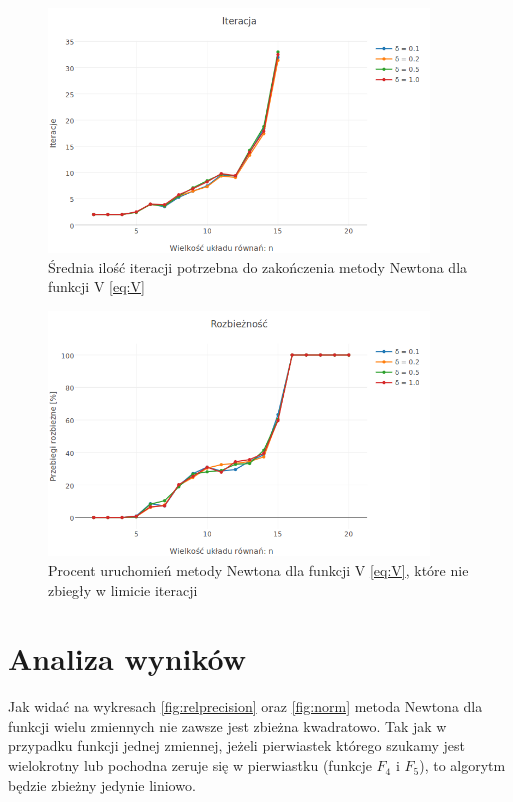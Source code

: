 \documentclass[11pt,wide]{mwart}
\begin{document}
\begin{figure}[h]
    \centering
    \includegraphics[width=0.9\textwidth]{avg_iterations_V}
    \caption{Średnia ilość iteracji potrzebna do zakończenia metody Newtona dla funkcji V \eqref{eq:V}}
    \label{fig:avgiterationsV}
\end{figure}

\begin{figure}[h]
    \centering
    \includegraphics[width=0.9\textwidth]{avg_diversions_V}
    \caption{Procent uruchomień metody Newtona dla funkcji V \eqref{eq:V}, które nie zbiegły w limicie iteracji}
    \label{fig:avgdiversionsV}
\end{figure}

\FloatBarrier
\section{Analiza wyników}

Jak widać na wykresach \ref{fig:relprecision} oraz \ref{fig:norm} metoda Newtona dla funkcji wielu zmiennych nie zawsze jest zbieżna kwadratowo. Tak jak w przypadku funkcji jednej zmiennej, jeżeli pierwiastek którego szukamy jest wielokrotny lub pochodna zeruje się w pierwiastku (funkcje $ F_4 $ i $ F_5 $), to algorytm będzie zbieżny jedynie liniowo.
\end{document}
